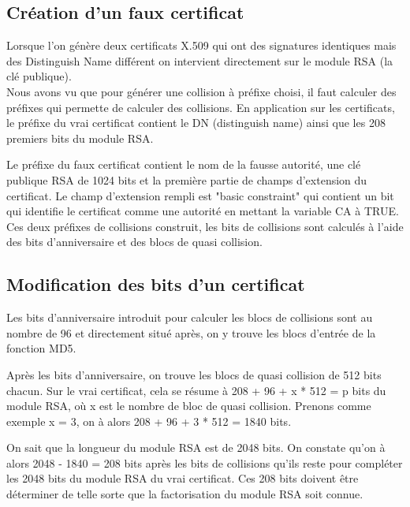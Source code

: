 \documentclass[a4paper,11pt,french]{article}
\begin{document}
\subsection{Création d'un faux certificat}
Lorsque l'on génère deux certificats X.509 qui ont des signatures identiques mais des Distinguish Name différent on intervient directement sur le module RSA (la clé publique).\\

Nous avons vu que pour générer une collision à préfixe choisi, il faut calculer des préfixes qui permette de calculer des collisions. En application sur les certificats, le préfixe du vrai certificat contient le DN (distinguish name) ainsi que les 208 premiers bits du module RSA.

Le préfixe du faux certificat contient le nom de la fausse autorité, une clé publique RSA de 1024 bits et la première partie de champs d'extension du certificat. Le champ d'extension rempli est "basic constraint" qui contient un bit qui identifie le certificat comme une autorité en mettant la variable CA à TRUE.\\

Ces deux préfixes de collisions construit, les bits de collisions sont calculés à l'aide des bits d'anniversaire et des blocs de quasi collision.

\subsection{Modification des bits d'un certificat}
Les bits d'anniversaire introduit pour calculer les blocs de collisions sont au nombre de 96 et directement situé après, on y trouve les blocs d'entrée de la fonction MD5.

Après les bits d'anniversaire, on trouve les blocs de quasi collision de 512 bits chacun. Sur le vrai certificat, cela se résume à 208 + 96 + x * 512 = p bits du module RSA, où x est le nombre de bloc de quasi collision. Prenons comme exemple x = 3, on à alors 208 + 96 + 3 * 512 = 1840 bits.

On sait que la longueur du module RSA est de 2048 bits. On constate qu'on à alors 2048 - 1840 = 208 bits après les bits de collisions qu'ils reste pour compléter les 2048 bits du module RSA du vrai certificat. Ces 208 bits doivent être déterminer de telle sorte que la factorisation du module RSA soit connue.

\end{document}
